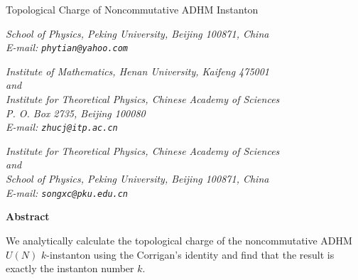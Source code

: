 \documentclass[a4paper,a4paper]{article}
\begin{document}
\thispagestyle{empty}

\begin{center}
{\Large %
Topological Charge of Noncommutative ADHM Instanton}
\end{center}

\vspace*{2cm} %

\begin{center}
 \vspace{5mm} \noindent \hspace{0.7cm}
\parbox{120mm}{\it
School of Physics, Peking University, Beijing 100871, China
\\
E-mail: {\tt phytian@yahoo.com}
 }
\end{center}

\vspace{5mm} %

\begin{center}
 \vspace{5mm} \noindent \hspace{0.7cm}
\parbox{120mm}{\it
Institute of Mathematics, Henan University, Kaifeng 475001
\\
and
\\
Institute for Theoretical Physics, Chinese Academy of Sciences
\\
P. O. Box 2735, Beijing 100080
\\
E-mail: {\tt zhucj@itp.ac.cn}
 }
\end{center}

\vspace{5mm} %

\begin{center}
 \vspace{5mm} \noindent
\hspace{0.7cm}
\parbox{120mm}{\it
Institute for Theoretical Physics, Chinese Academy of Sciences
\\
and
\\
School of Physics, Peking University, Beijing 100871, China
\\
E-mail: {\tt songxc@pku.edu.cn}
 }
\end{center}

\vspace{2cm}

\begin{center}
\textbf{Abstract}
\end{center}
We analytically calculate the topological charge of the noncommutative ADHM $%
U(N)$ $k$-instanton using the Corrigan's identity and find that the result
is exactly the instanton number $k$.
\end{document}

